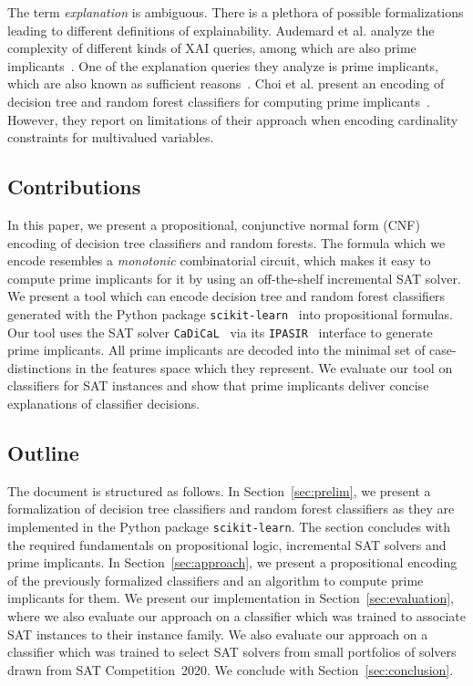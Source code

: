 \documentclass{easychair}
\theoremstyle{definition}
\begin{document}
The term \emph{explanation} is ambiguous. 
There is a plethora of possible formalizations leading to different definitions of explainability. 
Audemard et al. analyze the complexity of different kinds of XAI queries, among which are also prime implicants~\cite{Audemard:2020:XAI}. 
One of the explanation queries they analyze is prime implicants, which are also known as sufficient reasons~\cite{Darwiche:2020:Reasons}. 
Choi et al. present an encoding of decision tree and random forest classifiers for computing prime implicants~\cite{Choi:2020:RF}. 
However, they report on limitations of their approach when encoding cardinality constraints for multivalued variables. 

\subsection{Contributions}

In this paper, we present a propositional, conjunctive normal form (CNF) encoding of decision tree classifiers and random forests. 
The formula which we encode resembles a \emph{monotonic} combinatorial circuit, which makes it easy to compute prime implicants for it by using an off-the-shelf incremental SAT solver. 
We present a tool which can encode decision tree and random forest classifiers generated with the Python package \verb!scikit-learn!~\cite{Pedregosa:2011:Scikit} into propositional formulas. 
Our tool uses the SAT solver \verb!CaDiCaL!~\cite{Biere:2020:Cadical} via its \verb!IPASIR!~\cite{Balyo:2016:Ipasir} interface to generate prime implicants. 
All prime implicants are decoded into the minimal set of case-distinctions in the features space which they represent. 
We evaluate our tool on classifiers for SAT instances and show that prime implicants deliver concise explanations of classifier decisions. 

\subsection{Outline}

The document is structured as follows. 
In Section~\ref{sec:prelim}, we present a formalization of decision tree classifiers and random forest classifiers as they are implemented in the Python package \verb!scikit-learn!. 
The section concludes with the required fundamentals on propositional logic, incremental SAT solvers and prime implicants. 
In Section~\ref{sec:approach}, we present a propositional encoding of the previously formalized classifiers and an algorithm to compute prime implicants for them. 
We present our implementation in Section~\ref{sec:evaluation}, where we also evaluate our approach on a classifier which was trained to associate SAT instances to their instance family. 
We also evaluate our approach on a classifier which was trained to select SAT solvers from small portfolios of solvers drawn from SAT Competition~2020. 
We conclude with Section~\ref{sec:conclusion}. 
\end{document}
